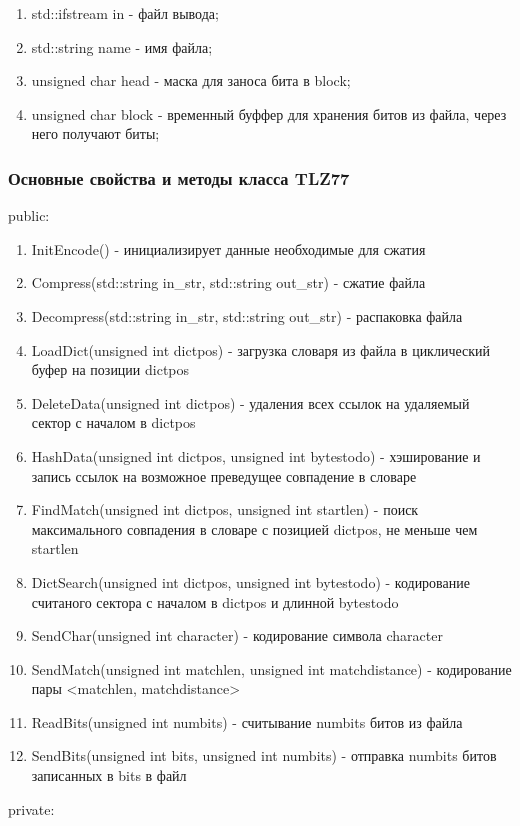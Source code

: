 \documentclass[12pt]{article}
\begin{document}
\begin{enumerate}
	\item std::ifstream in - файл вывода;
    \item std::string name - имя файла;
    \item unsigned char head - маска для заноса бита в block;
    \item unsigned char block - временный буффер для хранения битов из файла, через него получают биты;
\end{enumerate}

\subsubsection*{Основные свойства и методы класса TLZ77}%
\noindent
public:

\begin{enumerate}
	\item InitEncode() - инициализирует данные необходимые для сжатия
	\item Compress(std::string in\_str, std::string out\_str) - сжатие файла 
	\item Decompress(std::string in\_str, std::string out\_str) -  распаковка файла
	\item LoadDict(unsigned int dictpos) - загрузка словаря из файла в циклический буфер на позиции dictpos
	\item DeleteData(unsigned int dictpos) - удаления всех ссылок на удаляемый сектор с началом в dictpos
	\item HashData(unsigned int dictpos, unsigned int bytestodo) - хэширование и запись ссылок на возможное преведущее совпадение в словаре
	\item FindMatch(unsigned int dictpos, unsigned int startlen) - поиск максимального совпадения в словаре с позицией dictpos, не меньше чем startlen 
	\item DictSearch(unsigned int dictpos, unsigned int bytestodo) - кодирование считаного сектора с началом в dictpos и длинной bytestodo 
	\item SendChar(unsigned int character) - кодирование символа character
	\item SendMatch(unsigned int matchlen, unsigned int matchdistance) - кодирование пары <matchlen, matchdistance>
	\item ReadBits(unsigned int numbits) - считывание numbits битов из файла
	\item SendBits(unsigned int bits, unsigned int numbits) - отправка numbits битов записанных в bits в файл
\end{enumerate}
\noindent
private:
\end{document}
